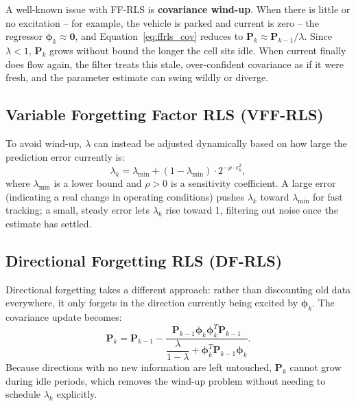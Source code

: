 A well-known issue with FF-RLS is \textbf{covariance wind-up}. When there is little or no excitation -- for example, the vehicle is parked and current is zero -- the regressor $\boldsymbol{\phi}_k \approx \mathbf{0}$, and Equation~\eqref{eq:ffrls_cov} reduces to $\mathbf{P}_k \approx \mathbf{P}_{k-1}/\lambda$. Since $\lambda < 1$, $\mathbf{P}_k$ grows without bound the longer the cell sits idle. When current finally does flow again, the filter treats this stale, over-confident covariance as if it were fresh, and the parameter estimate can swing wildly or diverge.

\subsection{Variable Forgetting Factor RLS (VFF-RLS)}
\label{subsec:ch5_vffrls}

To avoid wind-up, $\lambda$ can instead be adjusted dynamically based on how large the prediction error currently is:
\begin{equation}
\lambda_k = \lambda_{\min} + (1 - \lambda_{\min}) \cdot 2^{-\rho \cdot e_k^2},
\label{eq:vff_update}
\end{equation}
where $\lambda_{\min}$ is a lower bound and $\rho > 0$ is a sensitivity coefficient. A large error (indicating a real change in operating conditions) pushes $\lambda_k$ toward $\lambda_{\min}$ for fast tracking; a small, steady error lets $\lambda_k$ rise toward 1, filtering out noise once the estimate has settled.

\subsection{Directional Forgetting RLS (DF-RLS)}
\label{subsec:ch5_dfrls}

Directional forgetting takes a different approach: rather than discounting old data everywhere, it only forgets in the direction currently being excited by $\boldsymbol{\phi}_k$. The covariance update becomes:
\begin{equation}
\mathbf{P}_k = \mathbf{P}_{k-1} - \frac{\mathbf{P}_{k-1} \boldsymbol{\phi}_k \boldsymbol{\phi}_k^T \mathbf{P}_{k-1}}{\dfrac{\lambda}{1 - \lambda} + \boldsymbol{\phi}_k^T \mathbf{P}_{k-1} \boldsymbol{\phi}_k}.
\label{eq:dfrls_cov}
\end{equation}
Because directions with no new information are left untouched, $\mathbf{P}_k$ cannot grow during idle periods, which removes the wind-up problem without needing to schedule $\lambda_k$ explicitly.

